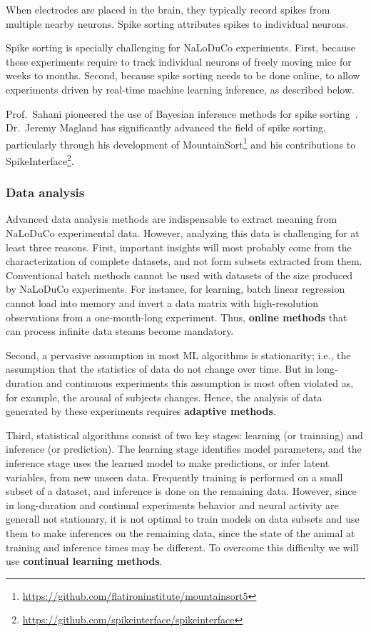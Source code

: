 When electrodes are placed in the brain, they typically record spikes from
multiple nearby neurons. Spike sorting attributes spikes to individual neurons.

Spike sorting is specially challenging for NaLoDuCo experiments.
%
First, because these experiments require to track individual neurons of freely
moving mice for weeks to months.
%
Second, because spike sorting needs to be done online, to allow experiments
driven by real-time machine learning inference, as described below.

Prof.~Sahani pioneered the use of Bayesian inference methods for spike
sorting~\citep{sahani99}.
%
Dr.~Jeremy Magland has significantly advanced the field of spike sorting,
particularly through his development of
MountainSort\footnote{\url{https://github.com/flatironinstitute/mountainsort5}}
and his contributions to
SpikeInterface\footnote{\url{https://github.com/spikeinterface/spikeinterface}}.

\subsubsection{Data analysis}

Advanced data analysis methods are indispensable to extract meaning from
NaLoDuCo experimental data.
%
However, analyzing this data is challenging for at least three reasons.
%
First, important insights will most probably come from the characterization of
complete datasets, and not form subsets extracted from them. Conventional batch
methods cannot be used with datasets of the size produced by NaLoDuCo
experiments.
%
For instance, for learning, batch linear regression cannot load into memory and
invert a data matrix with high-resolution observations from a one-month-long
experiment.
%
Thus, \textbf{online methods} that can process infinite data steams become
mandatory.

Second, a pervasive assumption in most ML algorithms is stationarity; i.e., the
assumption that the statistics of data do not change over time.
%
But in long-duration and continuous experiments this assumption is most often
violated as, for example, the arousal of subjects changes.
%
Hence, the analysis of data generated by these experiments requires
\textbf{adaptive methods}.

Third, statistical algorithms consist of two key stages: learning (or
trainning) and inference (or prediction). The learning stage identifies model
parameters, and the inference stage uses the learned model to make predictions,
or infer latent variables, from new unseen data.
%
Frequently training is performed on a small subset of a dataset, and inference
is done on the remaining data.  However, since in long-duration and continual
experiments behavior and neural activity are generall not stationary, it is not
optimal to train models on data subsets and use them to make inferences on the
remaining data, since the state of the animal at training and inference times
may be different.
%
To overcome this difficulty we will use \textbf{continual learning methods}.

